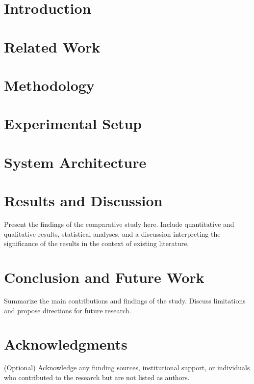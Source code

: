 \documentclass[11pt,twoside,openright]{book}
\begin{document}
\tableofcontents

\mainmatter

\chapter{Introduction}


\chapter{Related Work}


\chapter{Methodology}


\chapter{Experimental Setup}


\chapter{System Architecture}


\chapter{Results and Discussion}
Present the findings of the comparative study here. Include quantitative and qualitative results, statistical analyses, and a discussion interpreting the significance of the results in the context of existing literature.

\chapter{Conclusion and Future Work}
Summarize the main contributions and findings of the study. Discuss limitations and propose directions for future research.

\backmatter

\chapter*{Acknowledgments}
(Optional) Acknowledge any funding sources, institutional support, or individuals who contributed to the research but are not listed as authors.



\end{document}
